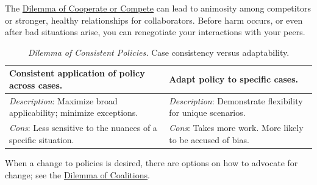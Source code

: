 The \hyperref[table:dilemma-personal-cooperate-vs-compete]{Dilemma of Cooperate or Compete} can lead to animosity among competitors or stronger, healthy relationships for collaborators. Before harm occurs, or even after bad situations arise, you can renegotiate your interactions with your peers. 



\begin{center}
\begin{table}[H] %
\begin{tabular}{ | m{\dilemmatablewidth}| m{\dilemmatablewidth} | }
  \hline
  \textbf{Consistent application of policy across cases.} &
  \textbf{Adapt policy to specific cases.} \\
  \hline
  \textit{Description}: Maximize broad applicability; minimize exceptions. &
  \textit{Description}: Demonstrate flexibility for unique scenarios. \\  
  \hline
  \textit{Cons}: Less sensitive to the nuances of a specific situation. & 
  \textit{Cons}: Takes more work. More likely to be accused of bias. \\
  \hline
\end{tabular}
\caption{
\textit{Dilemma of Consistent Policies.}
Case consistency versus adaptability.
}
\label{table:dilemma-personal-policy-consistency-across-cases}
\end{table}
\end{center}

When a change to policies is desired, there are options on how to advocate for change; see the \hyperref[table:dilemma-how-to-change]{Dilemma of Coalitions}.



